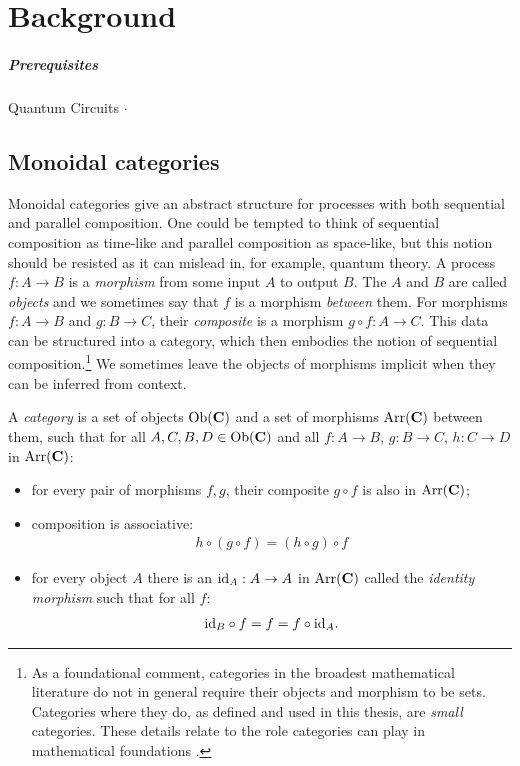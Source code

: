 \chapter{Background}

\todo{\chapabstract{}}

\paragraph{Prerequisites} Quantum Circuits $\cdot$

\section{Monoidal categories}
Monoidal categories give an abstract structure for processes with both sequential and parallel composition. One could be tempted to think of sequential composition as time-like and parallel composition as space-like, but this notion should be resisted as it can mislead in, for example, quantum theory.  A process $f:A\to B$ is a \emph{morphism} from some input $A$ to output $B$. The $A$ and $B$ are called \emph{objects} and we sometimes say that $f$ is a morphism \emph{between} them. For morphisms $f:A\to B$ and $g:B\to C$, their \emph{composite} is a morphism $g\circ f:A\to C$. This data can be structured into a category, which then embodies the notion of sequential composition.\footnote{As a foundational comment, categories in the broadest mathematical literature do not in general require their objects and morphism to be sets. Categories where they do, as defined and used in this thesis, are \emph{small} categories. These details relate to the role categories can play in mathematical foundations \cite{mac1969one}.} We sometimes leave the objects of morphisms implicit when they can be inferred from context.

\begin{defn}
A \emph{category}  is a set of objects $\mbox{Ob}(\mathbf{C})$ and a set of morphisms $\mbox{Arr}(\mathbf{C})$ between them, such that for all $A,C,B,D\in \mbox{Ob}(\mathbf{C})$ and all $f:A\to B$, $g:B\to C$, $h:C\to D$ in $\mbox{Arr}(\mathbf{C})$:
\begin{itemize}
\item for every pair of morphisms $f,g$, their composite $g\circ f$ is also in $\mbox{Arr}(\mathbf{C})$;
\item composition is associative:
\begin{align}
h\circ(g\circ f) = (h\circ g)\circ f
\end{align}
\item for every object $A$ there is an $\mbox{id}_{A}:A\to A$ in $\mbox{Arr}(\mathbf{C})$ called the \emph{identity morphism} such that for all $f$:
\begin{align}
\mbox{id}_{B}\circ f = f = f\circ\mbox{id}_{A}.
\end{align}
\end{itemize}
\end{defn}
 
